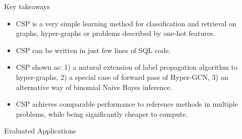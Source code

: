 \documentclass{beamer}
\newlength{\colwidth}
\begin{document}
\begin{frame}[fragile,t]
\begin{columns}[t]
\begin{column}{\colwidth}
	\begin{alertblock}{Key takeaways}
		\begin{itemize}
			\item CSP is a very simple learning method for classification and retrieval on graphs, hyper-graphs or problems described by one-hot features.
			\item CSP can be written in just few lines of SQL code.
			\item CSP shown as: 1) a natural extension of label propagation algorithm to hyper-graphs, 2) a special case of forward pass of Hyper-GCN, 3) an alternative way of binomial Naive Bayes inference.
			\item CSP achieves comparable performance to reference methods in multiple problems, while being significantly cheaper to compute.
		\end{itemize}
	\end{alertblock}

	\begin{block}{Evaluated Applications}
	\end{block}


\end{column}
\end{columns}
\end{frame}
\end{document}
